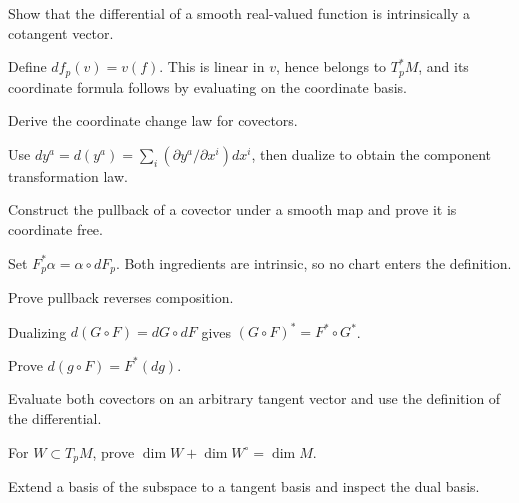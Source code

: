 \begin{problem}\label{prob:vii05-02}
Show that the differential of a smooth real-valued function is intrinsically a cotangent vector.
\end{problem}
\begin{solution}
Define \(df_p(v)=v(f)\). This is linear in \(v\), hence belongs to \(T_p^*M\), and its coordinate formula follows by evaluating on the coordinate basis.
\end{solution}

\begin{problem}\label{prob:vii05-03}
Derive the coordinate change law for covectors.
\end{problem}
\begin{solution}
Use \(dy^a=d(y^a)=\sum_i(\partial y^a/\partial x^i)dx^i\), then dualize to obtain the component transformation law.
\end{solution}

\begin{problem}\label{prob:vii05-04}
Construct the pullback of a covector under a smooth map and prove it is coordinate free.
\end{problem}
\begin{solution}
Set \(F_p^*\alpha=\alpha\circ dF_p\). Both ingredients are intrinsic, so no chart enters the definition.
\end{solution}

\begin{problem}\label{prob:vii05-05}
Prove pullback reverses composition.
\end{problem}
\begin{solution}
Dualizing \(d(G\circ F)=dG\circ dF\) gives \((G\circ F)^*=F^*\circ G^*\).
\end{solution}

\begin{problem}\label{prob:vii05-06}
Prove \(d(g\circ F)=F^*(dg)\).
\end{problem}
\begin{solution}
Evaluate both covectors on an arbitrary tangent vector and use the definition of the differential.
\end{solution}

\begin{problem}\label{prob:vii05-07}
For \(W\subset T_pM\), prove \(\dim W+\dim W^\circ=\dim M\).
\end{problem}
\begin{solution}
Extend a basis of the subspace to a tangent basis and inspect the dual basis.
\end{solution}

